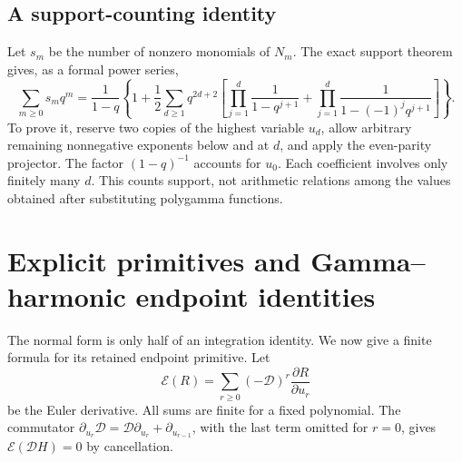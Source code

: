 \documentclass[11pt,letterpaper]{article}
\numberwithin{equation}{section}
\theoremstyle{definition}\newtheorem{definition}[theorem]{Definition}
\theoremstyle{remark}\newtheorem{remark}[theorem]{Remark}
\newcommand{\D}{\mathcal D}\newcommand{\NF}{\mathcal N}\newcommand{\HF}{\mathcal H}
\begin{document}
\subsection{A support-counting identity}
Let $s_m$ be the number of nonzero monomials of $N_m$.
The exact support theorem gives, as a formal power series,
\begin{equation}\label{ubg:eq:support-generator}
 \sum_{m\ge0}s_mq^m
 =\frac1{1-q}\left\{1+\frac12\sum_{d\ge1}q^{2d+2}
  \left[\prod_{j=1}^d\frac1{1-q^{j+1}}
       +\prod_{j=1}^d\frac1{1-(-1)^jq^{j+1}}\right]\right\}.
\end{equation}
To prove it, reserve two copies of the highest variable $u_d$, allow
arbitrary remaining nonnegative exponents below and at $d$, and apply
the even-parity projector. The factor $(1-q)^{-1}$ accounts for $u_0$.
Each coefficient involves only finitely many $d$.
This counts support, not arithmetic relations among the values obtained
after substituting polygamma functions.

\section{Explicit primitives and Gamma--harmonic endpoint identities}
\label{ubg:sec:primitives}

The normal form is only half of an integration identity. We now give
a finite formula for its retained endpoint primitive.
Let
\begin{equation}\label{ubg:eq:Euler}
 \mathscr E(R)=\sum_{r\ge0}(-\D)^r\frac{\partial R}{\partial u_r}
\end{equation}
be the Euler derivative. All sums are finite for a fixed polynomial.
The commutator
$\partial_{u_r}\D=\D\partial_{u_r}+\partial_{u_{r-1}}$, with the last
term omitted for $r=0$, gives $\mathscr E(\D H)=0$ by cancellation.
\end{document}
